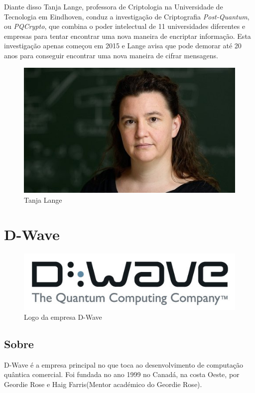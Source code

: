 \documentclass{report}
\begin{document}
	
	Diante disso Tanja Lange, professora de Criptologia na Universidade de Tecnologia em Eindhoven, conduz a investigação de Criptografia \emph{Post-Quantum}, ou \emph{PQCrypto}, que combina o poder intelectual de 11 universidades diferentes e empresas para tentar encontrar uma nova maneira de encriptar informação. Esta investigação apenas começou em 2015 e Lange avisa que pode demorar até 20 anos para conseguir encontrar uma nova maneira de cifrar mensagens.
	
\begin{figure}[!h]
	\centering
	\includegraphics[scale=0.3]{Tanja_Lange.jpg} 
	\caption{Tanja Lange}
	\label{Lange}
\end{figure}
	

\chapter{D-Wave}
\label{chap.D-Wave}
	\begin{figure}[!h]
		\centering
		\includegraphics[scale=0.5]{Logo_D-Wave.jpg} 
		\caption{Logo da empresa D-Wave}
		\label{D-Wave}
		
	\end{figure}		
	

\section{Sobre}
	D-Wave é a empresa principal no que toca ao desenvolvimento de computação quântica comercial. Foi fundada no ano 1999 no Canadá, na costa Oeste, por Geordie Rose e Haig Farris(Mentor académico do Geordie Rose).
	
\end{document}
